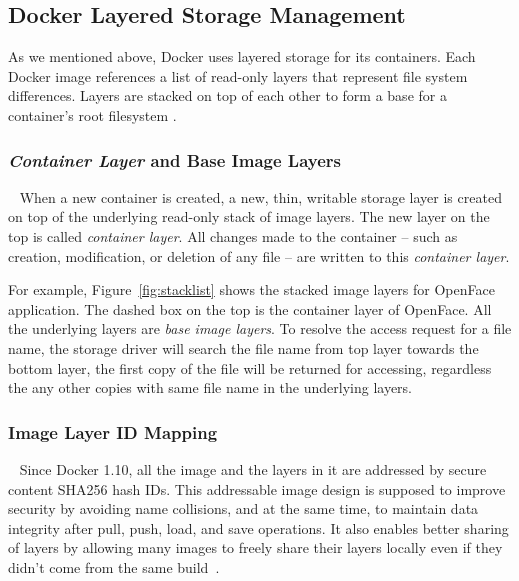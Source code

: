 
\subsection{Docker Layered Storage Management}\label{aufsIntroduction}

As we mentioned above, Docker uses layered storage for its containers. Each Docker image references a list of read-only layers that represent file system differences. Layers are stacked on top of each other to form a base for a container's root filesystem \cite{dockerlayer}. 



\smallbreak

\subsubsection{\textit{Container Layer} and Base Image Layers}
~\smallbreak
When a new container is created, a new, thin, writable storage layer is created on top of the underlying read-only stack of image layers. The new layer on the top is called  \textit{container layer}. All changes made to the container -- such as creation, modification, or deletion of any file -- are written to this \textit{container layer}\cite{dockerlayer}.

For example, 
Figure~\ref{fig:stacklist} shows the stacked image layers for OpenFace application. The dashed box on the top is the container layer of OpenFace. All the underlying layers are \textit{base image layers}. To resolve the access request for a file name, the storage driver will search the file name from top layer towards the bottom layer, the first copy of the file will be returned for accessing, regardless the any other copies with same file name in the underlying layers.




\smallbreak
\subsubsection{Image Layer ID Mapping}
~\smallbreak
Since Docker 1.10, all the image and the layers in it are addressed by secure content SHA256 hash IDs. 
This addressable image design is supposed to improve security by avoiding name collisions, and at the same time, to maintain data integrity after pull, push, load, and save operations. It also enables better sharing of layers by allowing many images to freely share their layers locally even if they didn't come from the same build~\cite{dockerlayer}. 


